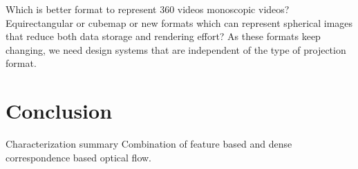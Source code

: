 Which is better format to represent 360 videos monoscopic videos? Equirectangular or cubemap or new formats which can represent spherical images that reduce both data storage and rendering effort? As these formats keep changing, we need design systems that are independent of the type of projection format. \newline

\section{Conclusion}

Characterization summary
Combination of feature based and dense correspondence based optical flow. 
